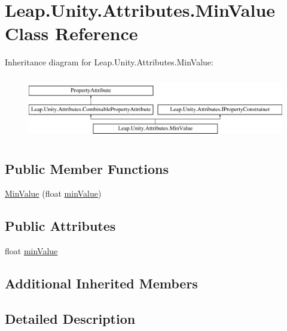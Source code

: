 \hypertarget{class_leap_1_1_unity_1_1_attributes_1_1_min_value}{}\section{Leap.\+Unity.\+Attributes.\+Min\+Value Class Reference}
\label{class_leap_1_1_unity_1_1_attributes_1_1_min_value}
Inheritance diagram for Leap.\+Unity.\+Attributes.\+Min\+Value\+:\begin{figure}[H]
\begin{center}
\leavevmode
\includegraphics[height=2.772277cm]{class_leap_1_1_unity_1_1_attributes_1_1_min_value}
\end{center}
\end{figure}
\subsection*{Public Member Functions}
\begin{DoxyCompactItemize}
\item 
\mbox{\hyperlink{class_leap_1_1_unity_1_1_attributes_1_1_min_value_a50d29094ef699f534d01b98e45aa7f7c}{Min\+Value}} (float \mbox{\hyperlink{class_leap_1_1_unity_1_1_attributes_1_1_min_value_a7caddfb2e69c9bbce5b0bbaf11cf78b3}{min\+Value}})
\end{DoxyCompactItemize}
\subsection*{Public Attributes}
\begin{DoxyCompactItemize}
\item 
float \mbox{\hyperlink{class_leap_1_1_unity_1_1_attributes_1_1_min_value_a7caddfb2e69c9bbce5b0bbaf11cf78b3}{min\+Value}}
\end{DoxyCompactItemize}
\subsection*{Additional Inherited Members}


\subsection{Detailed Description}


